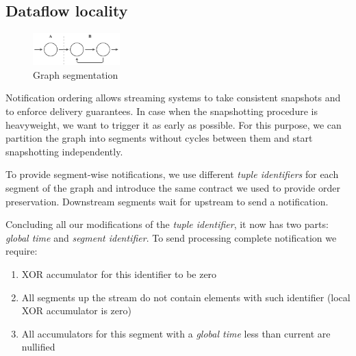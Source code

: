 

\subsection{Dataflow locality}

\begin{figure}[htbp]
  \centering
  \includegraphics[width=0.3\textwidth]{pics/graph-segments.pdf}
  \caption{Graph segmentation}
  \label{fig:tracker-acker-comparison}
\end{figure}

Notification ordering allows streaming systems to take consistent snapshots and to enforce delivery guarantees. In case when the snapshotting procedure is heavyweight, we want to trigger it as early as possible. For this purpose, we can partition the graph into segments without cycles between them and start snapshotting independently.

To provide segment-wise notifications, we use different \textit{tuple identifiers} for each segment of the graph and introduce the same contract we used to provide order preservation. Downstream segments wait for upstream to send a notification. 

Concluding all our modifications of the \textit{tuple identifier}, it now has two parts: \textit{global time} and \textit{segment identifier}. To send processing complete notification we require:
\begin{enumerate}
    \item XOR accumulator for this identifier to be zero
    \item All segments up the stream do not contain elements with such identifier (local XOR accumulator is zero)
    \item All accumulators for this segment with a  \textit{global time} less than current are nullified
\end{enumerate}

